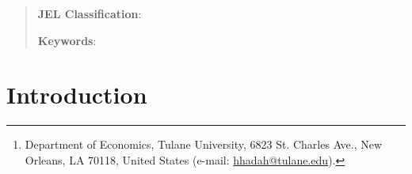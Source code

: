 \documentclass[12pt,english]{article}
\begin{document}
\title{}

\author{\href{https://hussainhadah.com/}{Hussain Hadah} \thanks{Department of Economics, Tulane University, 6823 St. Charles Ave., New Orleans, LA 70118, United States (e-mail: \href{mailto:hhadah@tulane.edu}{hhadah@tulane.edu}).}}


\maketitle
\begin{abstract}
\singlespacing 

\noindent\textbf{JEL Classification}: 

\noindent\textbf{Keywords}: 

\end{abstract}

\vfill
\pagebreak{}

\section{Introduction}


\pagebreak
\begingroup
{}
\setlength\bibitemsep{0pt}
\printbibliography
\endgroup
\pagebreak
\end{document}
